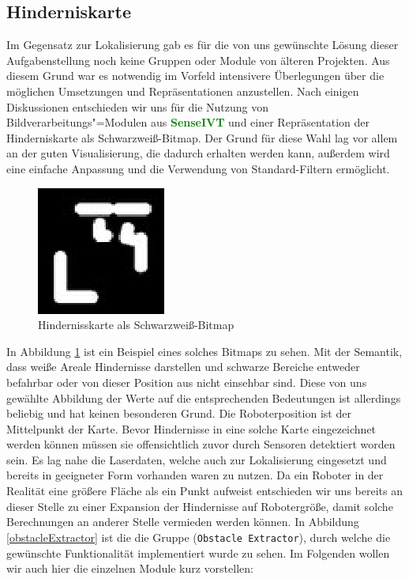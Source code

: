 \subsection{Hinderniskarte}
 Im Gegensatz zur Lokalisierung gab es für die von uns gewünschte Lösung dieser
 Aufgabenstellung noch keine Gruppen oder Module von älteren Projekten. Aus
 diesem Grund war es notwendig im Vorfeld intensivere Überlegungen über die möglichen
 Umsetzungen und Repräsentationen anzustellen.
 Nach einigen Diskussionen entschieden wir uns für die Nutzung von
 Bildverarbeitungs"=Modulen aus \textcolor{green}{\textbf{SenseIVT}}  und
 einer Repräsentation der Hinderniskarte als Schwarzweiß-Bitmap. Der Grund für diese Wahl lag vor allem an der guten
 Visualisierung, die dadurch erhalten werden kann, außerdem wird eine einfache Anpassung und die Verwendung
 von Standard-Filtern ermöglicht. 
\begin{figure}[h]
\center
\includegraphics[scale=0.7]{graphics/hinderniskarte.jpg}
\caption{\label{fig:hinderniskarte} Hindernisskarte als Schwarzweiß-Bitmap}
\end{figure}
 In Abbildung \ref{fig:hinderniskarte} ist ein Beispiel eines solches Bitmaps
 zu sehen. Mit der Semantik, dass weiße Areale Hindernisse darstellen und schwarze Bereiche entweder befahrbar
 oder von dieser Position aus nicht einsehbar sind. Diese von uns gewählte Abbildung der Werte
 auf die entsprechenden Bedeutungen ist allerdings beliebig und hat keinen besonderen Grund.
 Die Roboterposition ist der Mittelpunkt der Karte. Bevor Hindernisse in eine solche Karte eingezeichnet werden
 können müssen sie offensichtlich zuvor durch Sensoren detektiert worden sein. Es lag nahe die Laserdaten,
 welche auch zur Lokalisierung eingesetzt und bereits in geeigneter Form vorhanden waren zu nutzen.
 Da ein Roboter in der Realität eine größere Fläche als ein Punkt aufweist entschieden wir uns bereits an dieser
 Stelle zu einer Expansion der Hindernisse auf Robotergröße, damit solche Berechnungen an anderer Stelle vermieden
 werden können.
 In Abbildung \ref{obstacleExtractor} ist die die Gruppe (\lstinline{Obstacle Extractor}),
 durch welche die gewünschte Funktionalität implementiert wurde zu sehen.
 Im Folgenden wollen wir auch hier die einzelnen Module kurz vorstellen:

